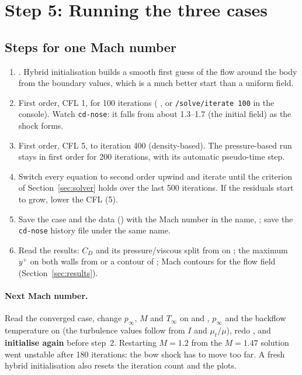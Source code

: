 \section{Step 5: Running the three cases}
\label{sec:runs}

\subsection{Steps for one Mach number}

\begin{enumerate}
\item {}\then{}\then{}. Hybrid initialisation builds a
smooth first guess of the flow around the body from the boundary values, which is a much better start
than a uniform field.
\item First order, CFL 1, for 100 iterations (\then{}\then
{}, or \texttt{/solve/iterate 100} in the console). Watch \texttt{cd-nose}: it falls
from about 1.3--1.7 (the initial field) as the shock forms.
\item First order, CFL 5, to iteration 400 (density-based). The pressure-based run stays in first order
for 200 iterations, with its automatic pseudo-time step.
\item Switch every equation to second order upwind and iterate until the criterion of
Section~\ref{sec:solver} holds over the last 500 iterations. If the residuals start to grow, lower the
CFL (5).
\item Save the case and the data (\then{}\then{}) with the Mach number
in the name, ; save the \texttt{cd-nose} history file under the same name.
\item Read the results: $C_D$ and its pressure/viscous split from \then{} on
; the maximum $y^+$ on both walls from \then{} or a
contour of ; Mach contours for the flow field (Section~\ref{sec:results}).
\end{enumerate}

\paragraph{Next Mach number.} Read the converged case, change $p_\infty$, $M$ and $T_\infty$ on
 and , $p_\infty$ and the backflow temperature on  (the
turbulence values follow from $I$ and $\mu_t/\mu$), redo \then{}
, and \textbf{initialise again} before step~2.
Restarting $M = 1.2$ from the $M = 1.47$ solution went unstable after 180 iterations: the bow shock has to
move too far. A fresh hybrid initialisation also resets the iteration count and the plots.

